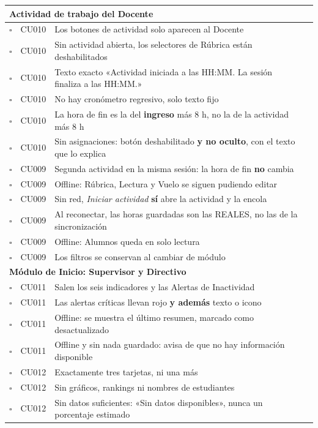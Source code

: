 \documentclass[11pt,a4paper]{article}
\newcommand{\ok}{$\square$}
\begin{document}
\begin{longtable}{|c|p{1.9cm}|p{6.1cm}|p{4.3cm}|}
\multicolumn{4}{|l|}{\cellcolor{grisclaro}\textbf{Actividad de trabajo del Docente}} \\ \hline
\ok & CU010 & Los botones de actividad solo aparecen al Docente & \\[0.5cm] \hline
\ok & CU010 & Sin actividad abierta, los selectores de Rúbrica están deshabilitados & \\[0.5cm] \hline
\ok & CU010 & Texto exacto «Actividad iniciada a las HH:MM. La sesión finaliza a las HH:MM.» & \\[0.5cm] \hline
\ok & CU010 & No hay cronómetro regresivo, solo texto fijo & \\[0.5cm] \hline
\ok & CU010 & La hora de fin es la del \textbf{ingreso} más 8 h, no la de la actividad más 8 h & \\[0.5cm] \hline
\ok & CU010 & Sin asignaciones: botón deshabilitado \textbf{y no oculto}, con el texto que lo explica & \\[0.5cm] \hline
\ok & CU009 & Segunda actividad en la misma sesión: la hora de fin \textbf{no} cambia & \\[0.5cm] \hline
\ok & CU009 & Offline: Rúbrica, Lectura y Vuelo se siguen pudiendo editar & \\[0.5cm] \hline
\ok & CU009 & Sin red, \emph{Iniciar actividad} \textbf{sí} abre la actividad y la encola & \\[0.5cm] \hline
\ok & CU009 & Al reconectar, las horas guardadas son las REALES, no las de la sincronización & \\[0.5cm] \hline
\ok & CU009 & Offline: Alumnos queda en solo lectura & \\[0.5cm] \hline
\ok & CU009 & Los filtros se conservan al cambiar de módulo & \\[0.5cm] \hline

\multicolumn{4}{|l|}{\cellcolor{grisclaro}\textbf{Módulo de Inicio: Supervisor y Directivo}} \\ \hline
\ok & CU011 & Salen los seis indicadores y las Alertas de Inactividad & \\[0.5cm] \hline
\ok & CU011 & Las alertas críticas llevan rojo \textbf{y además} texto o icono & \\[0.5cm] \hline
\ok & CU011 & Offline: se muestra el último resumen, marcado como desactualizado & \\[0.5cm] \hline
\ok & CU011 & Offline y sin nada guardado: avisa de que no hay información disponible & \\[0.5cm] \hline
\ok & CU012 & Exactamente tres tarjetas, ni una más & \\[0.5cm] \hline
\ok & CU012 & Sin gráficos, rankings ni nombres de estudiantes & \\[0.5cm] \hline
\ok & CU012 & Sin datos suficientes: «Sin datos disponibles», nunca un porcentaje estimado & \\[0.5cm] \hline


\end{longtable}
\end{document}
